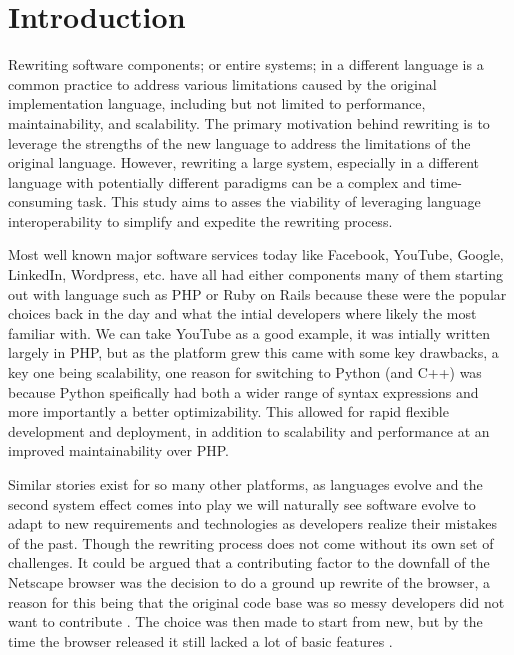 \section{Introduction}\label{s:intro}




Rewriting software components; or entire systems; in a different language is a common practice to address various limitations caused by the original implementation language, including but not limited to performance, maintainability, and scalability. The primary motivation behind rewriting is to leverage the strengths of the new language to address the limitations of the original language. However, rewriting a large system, especially in a different language with potentially different paradigms can be a complex and time-consuming task. This study aims to asses the viability of leveraging language interoperability to simplify and expedite the rewriting process.

Most well known major software services today like Facebook, YouTube, Google, LinkedIn, Wordpress, etc. have all had either components many of them starting out with language such as PHP or Ruby on Rails because these were the popular choices back in the day and what the intial developers where likely the most familiar with. We can take YouTube as a good example, it was intially written largely in PHP, but as the platform grew this came with some key drawbacks, a key one being scalability, one reason for switching to Python (and C++) was because Python speifically had both a wider range of syntax expressions and more importantly a better optimizability. This allowed for rapid flexible development and deployment, in addition to scalability and performance at an improved maintainability over PHP.\  

Similar stories exist for so many other platforms, as languages evolve and the second system effect comes into play we will naturally see software evolve to adapt to new requirements and technologies as developers realize their mistakes of the past. Though the rewriting process does not come without its own set of challenges. It could be argued that a contributing factor to the downfall of the Netscape browser was the decision to do a ground up rewrite of the browser, a reason for this being that the original code base was so messy developers did not want to contribute \textcite{pogue2000netscape}. The choice was then made to start from new, but by the time the browser released it still lacked a lot of basic features \textcite{zawinski1999resignation}. 

